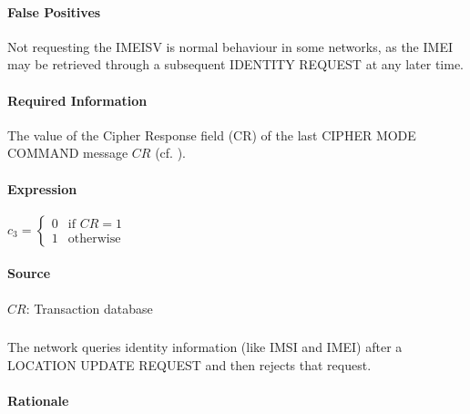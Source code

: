 \documentclass[a4paper,11pt,notitlepage,bigheadings,oneside]{scrartcl}
\begin{document}
\paragraph{False Positives}

Not requesting the IMEISV is normal behaviour in some networks, as the IMEI may
be retrieved through a subsequent IDENTITY REQUEST at any later time.

\paragraph{Required Information}

The value of the Cipher Response field (CR) of the last CIPHER MODE COMMAND
message $CR$ (cf. \cite[10.5.2.10]{gsm0408}).

\paragraph{Expression}

$c_3 =
\begin{cases}
	0       & \text{if } CR = 1 \\
	1	& \text{otherwise}
\end{cases}$



\paragraph{Source}

$CR$: Transaction database


\subsubsection{}

The network queries identity information (like IMSI and IMEI) after a LOCATION
UPDATE REQUEST and then rejects that request.

\paragraph{Rationale}
\end{document}
